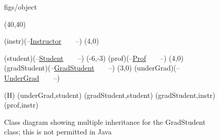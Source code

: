 





\begin {figure}


\Draw

 {figs/object}

\MinNodeSize(40,40)


\RectNode (instr)(--\underline {Instructor}~~~~--)
\MoveToExit(4,0)

\RectNode (student)(--\underline {Student}~~~~--)
\MoveToExit(-6,-3)
\RectNode (prof)(--\underline {Prof}~~~~--)
\MoveToExit(4,0)
\RectNode (gradStudent)(--\underline {GradStudent}~~~~--)
\MoveToExit(3,0)
\RectNode (underGrad)(--\underline {UnderGrad}~~~~--)

\ArrowSpec (H)
\Edge(underGrad,student)
\Edge(gradStudent,student)
\Edge(gradStudent,instr)
\Edge(prof,instr)

\EndDraw

\caption {Class diagram showing multiple inheritance for the
       GradStudent class; this is not permitted in Java}


\label {fig:multInher}

\end {figure}


